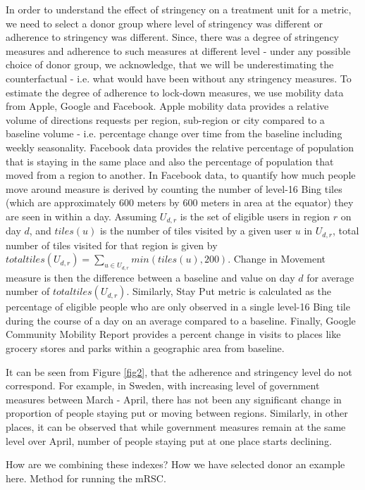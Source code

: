 \documentclass[preprint,authoryear,12pt]{elsarticle}
\begin{document}
    In order to understand the effect of stringency on a treatment unit for a metric, we need to select a donor group where level of stringency was different or adherence to stringency was different. Since, there was a degree of stringency measures and adherence to such measures at different level - under any possible choice of donor group, we acknowledge, that we will be underestimating the counterfactual - i.e. what would have been without any stringency measures. To estimate the degree of adherence to lock-down measures, we use mobility data from Apple, Google and Facebook. Apple mobility data provides a relative volume of directions requests per region, sub-region or city compared to a baseline volume - i.e. percentage change over time from the baseline including weekly seasonality. Facebook data provides the relative percentage of population that is staying in the same place and also the percentage of population that moved from a region to another.  In Facebook data, to quantify how much people move around measure is derived by counting the number of level-16 Bing tiles (which are approximately 600 meters by 600 meters in area at the equator) they are seen in within a day. Assuming $U_{d,r}$ is the set of eligible users in region $r$ on day $d$, and $tiles(u)$ is the number of tiles visited by a given user $u$ in $U_{d,r}$, total number of tiles visited for that region is given by $totaltiles(U_{d,r}) = \sum_{u \in U_{d,r}} min(tiles(u), 200)$. Change in Movement measure is then the difference between a baseline and value on day $d$ for average number of $totaltiles(U_{d,r})$. Similarly, Stay Put metric is calculated as the percentage of eligible people who are only observed in a single level-16 Bing tile during the course of a day on an average compared to a baseline. Finally, Google Community Mobility Report provides a percent change in visits to places like grocery stores and parks within a geographic area from baseline.
    
    It can be seen from Figure \ref{fig2}, that the adherence  and stringency level do not correspond. For example, in Sweden, with increasing level of government measures between March - April, there has not been any significant change in proportion of people staying put or moving between regions. Similarly, in other places, it can be observed that while government measures remain at the same level over April, number of people staying put at one place starts declining. 
    
    How are we combining these indexes? How we have selected donor an example here. Method for running the mRSC.
\end{document}
